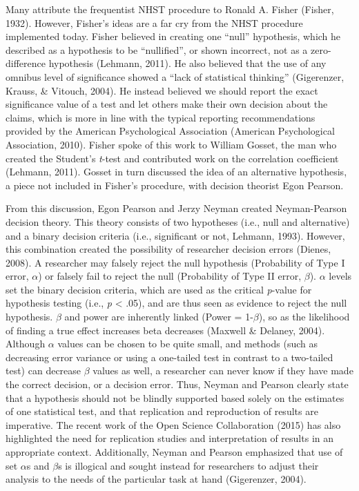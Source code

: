 \documentclass[,man, mask]{apa6}
\theoremstyle{definition}
\theoremstyle{definition}
\theoremstyle{definition}
\theoremstyle{remark}
\begin{document}
Many attribute the frequentist NHST procedure to Ronald A. Fisher
(Fisher, 1932). However, Fisher's ideas are a far cry from the NHST
procedure implemented today. Fisher believed in creating one
\enquote{null} hypothesis, which he described as a hypothesis to be
\enquote{nullified}, or shown incorrect, not as a zero-difference
hypothesis (Lehmann, 2011). He also believed that the use of any omnibus
level of significance showed a \enquote{lack of statistical thinking}
(Gigerenzer, Krauss, \& Vitouch, 2004). He instead believed we should
report the exact significance value of a test and let others make their
own decision about the claims, which is more in line with the typical
reporting recommendations provided by the American Psychological
Association (American Psychological Association, 2010). Fisher spoke of
this work to William Gosset, the man who created the Student's
\emph{t}-test and contributed work on the correlation coefficient
(Lehmann, 2011). Gosset in turn discussed the idea of an alternative
hypothesis, a piece not included in Fisher's procedure, with decision
theorist Egon Pearson.

From this discussion, Egon Pearson and Jerzy Neyman created
Neyman-Pearson decision theory. This theory consists of two hypotheses
(i.e., null and alternative) and a binary decision criteria (i.e.,
significant or not, Lehmann, 1993). However, this combination created
the possibility of researcher decision errors (Dienes, 2008). A
researcher may falsely reject the null hypothesis (Probability of Type I
error, \(\alpha\)) or falsely fail to reject the null (Probability of
Type II error, \(\beta\)). \(\alpha\) levels set the binary decision
criteria, which are used as the critical \emph{p}-value for hypothesis
testing (i.e., \emph{p} \textless{} .05), and are thus seen as evidence
to reject the null hypothesis. \(\beta\) and power are inherently linked
(Power = 1-\(\beta\)), so as the likelihood of finding a true effect
increases beta decreases (Maxwell \& Delaney, 2004). Although \(\alpha\)
values can be chosen to be quite small, and methods (such as decreasing
error variance or using a one-tailed test in contrast to a two-tailed
test) can decrease \(\beta\) values as well, a researcher can never know
if they have made the correct decision, or a decision error. Thus,
Neyman and Pearson clearly state that a hypothesis should not be blindly
supported based solely on the estimates of one statistical test, and
that replication and reproduction of results are imperative. The recent
work of the Open Science Collaboration (2015) has also highlighted the
need for replication studies and interpretation of results in an
appropriate context. Additionally, Neyman and Pearson emphasized that
use of set \(\alpha\)s and \(\beta\)s is illogical and sought instead
for researchers to adjust their analysis to the needs of the particular
task at hand (Gigerenzer, 2004).
\end{document}
